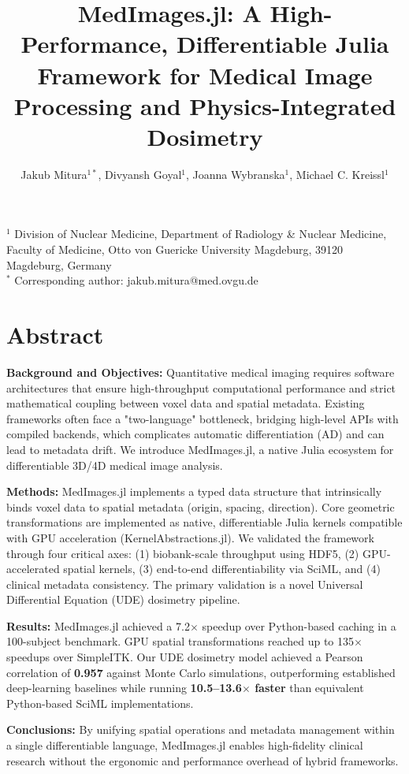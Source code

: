 \documentclass[10pt,letterpaper]{article}
\title{MedImages.jl: A High-Performance, Differentiable Julia Framework for Medical Image Processing and Physics-Integrated Dosimetry}
\author{Jakub Mitura$^{1*}$, Divyansh Goyal$^{1}$, Joanna Wybranska$^{1}$, Michael C. Kreissl$^{1}$}
\date{}
\begin{document}
\maketitle

\noindent
$^{1}$ Division of Nuclear Medicine, Department of Radiology \& Nuclear Medicine, Faculty of Medicine, Otto von Guericke University Magdeburg, 39120 Magdeburg, Germany \\
$^{*}$ Corresponding author: jakub.mitura@med.ovgu.de

\section*{Abstract}
\textbf{Background and Objectives:} Quantitative medical imaging requires software architectures that ensure high-throughput computational performance and strict mathematical coupling between voxel data and spatial metadata. Existing frameworks often face a "two-language" bottleneck, bridging high-level APIs with compiled backends, which complicates automatic differentiation (AD) and can lead to metadata drift. We introduce MedImages.jl, a native Julia ecosystem for differentiable 3D/4D medical image analysis.

\textbf{Methods:} MedImages.jl implements a typed data structure that intrinsically binds voxel data to spatial metadata (origin, spacing, direction). Core geometric transformations are implemented as native, differentiable Julia kernels compatible with GPU acceleration (KernelAbstractions.jl). We validated the framework through four critical axes: (1) biobank-scale throughput using HDF5, (2) GPU-accelerated spatial kernels, (3) end-to-end differentiability via SciML, and (4) clinical metadata consistency. The primary validation is a novel Universal Differential Equation (UDE) dosimetry pipeline.

\textbf{Results:} MedImages.jl achieved a 7.2$\times$ speedup over Python-based caching in a 100-subject benchmark. GPU spatial transformations reached up to 135$\times$ speedups over SimpleITK. Our UDE dosimetry model achieved a Pearson correlation of \textbf{0.957} against Monte Carlo simulations, outperforming established deep-learning baselines while running \textbf{10.5--13.6$\times$ faster} than equivalent Python-based SciML implementations.

\textbf{Conclusions:} By unifying spatial operations and metadata management within a single differentiable language, MedImages.jl enables high-fidelity clinical research without the ergonomic and performance overhead of hybrid frameworks.
\end{document}
